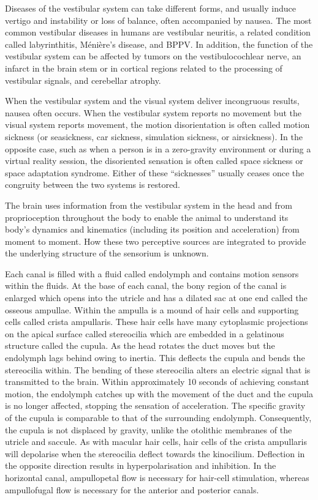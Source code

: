 \documentclass[]{book}
\begin{document}
Diseases of the vestibular system can take different forms, and usually induce vertigo and instability or loss of balance, often accompanied by nausea. The most common vestibular diseases in humans are vestibular neuritis, a related condition called labyrinthitis, Ménière's disease, and BPPV. In addition, the function of the vestibular system can be affected by tumors on the vestibulocochlear nerve, an infarct in the brain stem or in cortical regions related to the processing of vestibular signals, and cerebellar atrophy.

When the vestibular system and the visual system deliver incongruous results, nausea often occurs. When the vestibular system reports no movement but the visual system reports movement, the motion disorientation is often called motion sickness (or seasickness, car sickness, simulation sickness, or airsickness). In the opposite case, such as when a person is in a zero-gravity environment or during a virtual reality session, the disoriented sensation is often called space sickness or space adaptation syndrome. Either of these ``sicknesses'' usually ceases once the congruity between the two systems is restored.

The brain uses information from the vestibular system in the head and from proprioception throughout the body to enable the animal to understand its body's dynamics and kinematics (including its position and acceleration) from moment to moment. How these two perceptive sources are integrated to provide the underlying structure of the sensorium is unknown.

Each canal is filled with a fluid called endolymph and contains motion sensors within the fluids. At the base of each canal, the bony region of the canal is enlarged which opens into the utricle and has a dilated sac at one end called the osseous ampullae. Within the ampulla is a mound of hair cells and supporting cells called crista ampullaris. These hair cells have many cytoplasmic projections on the apical surface called stereocilia which are embedded in a gelatinous structure called the cupula. As the head rotates the duct moves but the endolymph lags behind owing to inertia. This deflects the cupula and bends the stereocilia within. The bending of these stereocilia alters an electric signal that is transmitted to the brain. Within approximately 10 seconds of achieving constant motion, the endolymph catches up with the movement of the duct and the cupula is no longer affected, stopping the sensation of acceleration. The specific gravity of the cupula is comparable to that of the surrounding endolymph. Consequently, the cupula is not displaced by gravity, unlike the otolithic membranes of the utricle and saccule. As with macular hair cells, hair cells of the crista ampullaris will depolarise when the stereocilia deflect towards the kinocilium. Deflection in the opposite direction results in hyperpolarisation and inhibition. In the horizontal canal, ampullopetal flow is necessary for hair-cell stimulation, whereas ampullofugal flow is necessary for the anterior and posterior canals.
\end{document}
